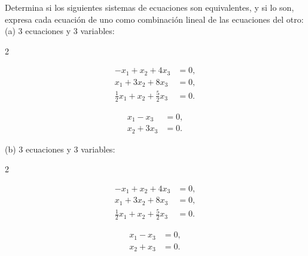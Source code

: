 \documentclass[12pt,a4paper]{book}
\begin{document}
    \begin{ejercicio}
        Determina si los siguientes sistemas de ecuaciones son equivalentes, y si lo son, expresa cada ecuación de uno como combinación lineal de las ecuaciones del otro:\\
        (a) 3 ecuaciones y 3 variables:
        \vspace{-1.5\baselineskip}
        \begin{multicols}{2}
            \begin{minipage}[t]{\linewidth}
                \begin{align}
                    -x_{1} + x_{2} + 4x_{3} &= 0, \\
                    x_{1} + 3x_{2} + 8x_{3} &= 0, \\
                    \frac{1}{2} x_{1} + x_{2} + \frac{5}{2} x_{3} &= 0.
                \end{align}
            \end{minipage}
            
            \columnbreak
            
            \begin{minipage}[t]{\linewidth}
                \begin{align*}
                    x_{1} - x_{3} &= 0, \\
                    x_{2} + 3x_{3} &= 0. 
                \end{align*}
            \end{minipage}
        \end{multicols}
        (b) 3 ecuaciones y 3 variables:
        \vspace{-1.5\baselineskip}
        \begin{multicols}{2}
            \begin{minipage}[t]{\linewidth}
                \begin{align*}
                    -x_{1} + x_{2} + 4x_{3} &= 0, \\
                    x_{1} + 3x_{2} + 8x_{3} &= 0,  \\
                    \frac{1}{2} x_{1} + x_{2} + \frac{5}{2} x_{3} &= 0. 
                \end{align*}
            \end{minipage}
            
            \columnbreak
            
            \begin{minipage}[t]{\linewidth}
                \begin{align*}
                    x_{1} - x_{3} & = 0, \\
                    x_{2} + x_{3} & = 0. 
                \end{align*}
                
            \end{minipage}
        \end{multicols}
    \end{ejercicio}
\end{document}
